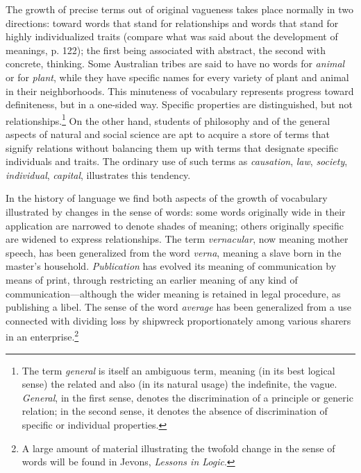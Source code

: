 \documentclass[letterpaper]{book}
\begin{document}
The growth of precise terms out of original vagueness takes place
normally in two directions: toward words that stand for relationships
and words that stand for highly individualized traits (compare what was
said about the development of meanings, p. 122); the first being
associated with abstract, the second with concrete, thinking. Some
Australian tribes are said to have no words for \emph{animal} or for
\emph{plant}, while they have specific names for every variety of plant
and animal in their neighborhoods. This minuteness of vocabulary
represents
progress toward definiteness, but in a one-sided way. Specific
properties are distinguished, but not
relationships.\footnote{
The term \emph{general} is itself an ambiguous term, meaning (in its
best logical sense) the related and also (in its natural usage) the
indefinite, the vague. \emph{General}, in the first sense, denotes the
discrimination of a principle or generic relation; in the second sense,
it denotes the absence of discrimination of specific or individual
properties.
}
On the other hand, students of philosophy and of the general aspects of
natural and social science are apt to acquire a store of terms that
signify relations without balancing them up with terms that designate
specific individuals and traits. The ordinary use of such terms as
\emph{causation}, \emph{law}, \emph{society}, \emph{individual},
\emph{capital}, illustrates this tendency.


In the history of language we find both aspects of the growth of
vocabulary illustrated by changes in the sense of words: some words
originally wide in their application are narrowed to denote shades of
meaning; others originally specific are widened to express
relationships. The term \emph{vernacular}, now meaning mother speech,
has been generalized from the word \emph{verna}, meaning a slave born in
the master's household. \emph{Publication} has evolved its meaning of
communication by means of print, through restricting an earlier meaning
of any kind of communication---although the wider meaning is retained in
legal procedure, as publishing a libel. The sense of the word
\emph{average} has been generalized from a use connected with dividing
loss by shipwreck proportionately among various sharers in an
enterprise.\footnote{
A large amount of material illustrating the twofold change in the sense
of words will be found in Jevons, \emph{Lessons in Logic}.
}
\end{document}
